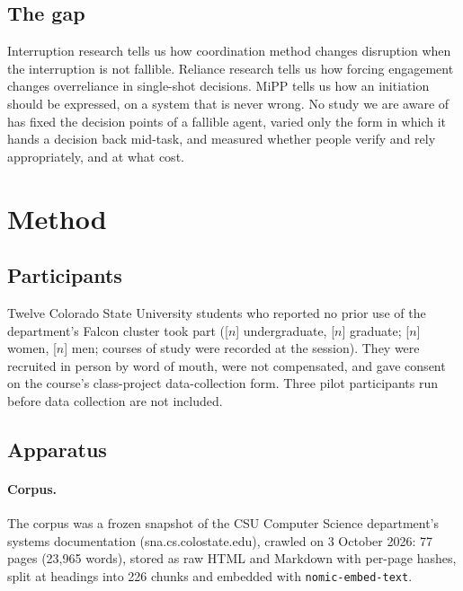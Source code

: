 \documentclass[manuscript,review]{acmart}
\begin{document}
\subsection{The gap}
Interruption research tells us how coordination method changes disruption
when the interruption is not fallible. Reliance research tells us how
forcing engagement changes overreliance in single-shot decisions. MiPP
tells us how an initiation should be expressed, on a system that is never
wrong. No study we are aware of has fixed the decision points of a fallible
agent, varied only the form in which it hands a decision back mid-task,
and measured whether people verify and rely appropriately, and at what
cost.

\section{Method}
\label{sec:method}


\subsection{Participants}
\label{sec:participants}
Twelve Colorado State University students who reported no prior use of
the department's Falcon cluster took part ([$n$] undergraduate, [$n$]
graduate; [$n$] women, [$n$] men; courses of study were recorded at the
session). They were recruited in person by word of mouth, were not
compensated, and gave consent on the course's class-project
data-collection form. Three pilot participants run before data collection
are not included.

\subsection{Apparatus}
\label{sec:apparatus}
\paragraph{Corpus.} The corpus was a frozen snapshot of the CSU Computer
Science department's systems documentation (sna.cs.colostate.edu), crawled
on 3 October 2026: 77 pages (23,965 words), stored as raw HTML and
Markdown with per-page hashes, split at headings into 226 chunks and
embedded with \texttt{nomic-embed-text}.
\end{document}
